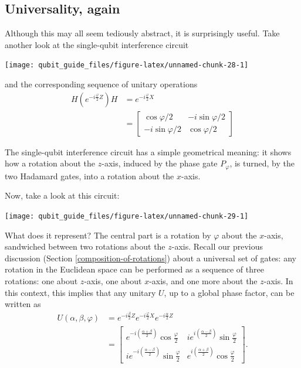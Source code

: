 \documentclass[fleqn,a4paper]{article}
\newenvironment{idea}{\everypar{\setlength{\parindent}{1.5em}}}{}
\theoremstyle{definition}
\theoremstyle{definition}
\theoremstyle{definition}
\theoremstyle{definition}
\theoremstyle{remark}
\begin{document}
\hypertarget{universality-again}{%
\subsection{Universality, again}\label{universality-again}}

Although this may all seem tediously abstract, it is surprisingly useful.
Take another look at the single-qubit interference circuit

\begin{center}\texttt{[image: qubit\_guide\_files/figure-latex/unnamed-chunk-28-1]} \end{center}

and the corresponding sequence of unitary operations
\[
  \begin{aligned}
    H \left(
      e^{-i\frac{\varphi}{2}Z}
    \right) H
    &= e^{-i\frac{\varphi}{2}X}
  \\&= \begin{bmatrix}
      \cos\varphi/2 & -i\sin\varphi/2
    \\-i\sin\varphi/2 & \cos\varphi/2
    \end{bmatrix}
  \end{aligned}
\]

\begin{idea}
The single-qubit interference circuit has a simple geometrical meaning: it shows how a rotation about the \(z\)-axis, induced by the phase gate \(P_\varphi\), is turned, by the two Hadamard gates, into a rotation about the \(x\)-axis.

\end{idea}

Now, take a look at this circuit:

\begin{center}\texttt{[image: qubit\_guide\_files/figure-latex/unnamed-chunk-29-1]} \end{center}

What does it represent?
The central part is a rotation by \(\varphi\) about the \(x\)-axis, sandwiched between two rotations about the \(z\)-axis.
Recall our previous discussion (Section \ref{composition-of-rotations}) about a universal set of gates: any rotation in the Euclidean space can be performed as a sequence of three rotations: one about \(z\)-axis, one about \(x\)-axis, and one more about the \(z\)-axis.
In this context, this implies that any unitary \(U\), up to a global phase factor, can be written as
\[
  \begin{aligned}
    U(\alpha, \beta, \varphi)
    &= e^{-i\frac{\beta}{2}Z} e^{-i\frac{\varphi}{2}X} e^{-i\frac{\alpha}{2}Z}
  \\&= \begin{bmatrix}
      e^{-i\left(\frac{\alpha+\beta}{2}\right)}\cos\frac{\varphi}{2}
      & ie^{i\left(\frac{\alpha-\beta}{2}\right)}\sin\frac\varphi{2}
    \\ie^{-i\left(\frac{\alpha-\beta}{2}\right)}\sin\frac\varphi{2}
      & e^{i\left(\frac{\alpha+\beta}{2}\right)}\cos\frac\varphi{2}
    \end{bmatrix}.
  \end{aligned}
\]
\end{document}
